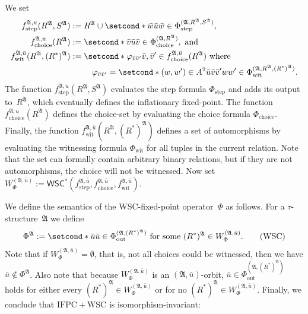 \documentclass[]{lmcs}
\renewcommand{\phi}{\varphi}
\newcommand{\formA}{\Phi}
\newcommand{\autoA}{\phi}
\newcommand{\tup}[1]{\bar{#1}}
\newcommand{\Struct}{\mathfrak{A}}
\newcommand{\vertA}{u}
\newcommand{\vertB}{v}
\newcommand{\vertC}{w}
\newcommand{\StructA}{\mathfrak{A}}
\newcommand{\StructVA}{A}
\newcommand{\sig}{\tau}
\newcommand{\IFPCWSC}{\ensuremath{\mathrm{IFPC{+}WSC}}}
\newcommand{\hiddenEqq}{\phantom{{}:={}}}
\newcommand{\formOut}{\formA_{\text{out}}}
\newcommand{\formStep}{\formA_{\text{step}}}
\newcommand{\formChoice}{\formA_{\text{choice}}}
\newcommand{\formWit}{\formA_{\text{wit}}}
\newcommand{\stepF}[0]{f_{\text{step}}}
\newcommand{\choiceF}[0]{f_{\text{choice}}}
\newcommand{\autF}[0]{f_{\text{wit}}}
\newcommand{\wscStarSym}{\mathsf{WSC}^*}
\newcommand{\wsc}[3]{\wscStarSym(#1,#2,#3)}
\begin{document}
We set
\begin{align*}
	\stepF^{\Struct, \tup{\vertA}}(R^\Struct,S^\Struct) &:= 
	R^\Struct\cup \setcond*{\tup{\vertC}}{
		\tup{\vertA}\tup{\vertC} \in \formStep^{(\StructA, R^\Struct, S^\Struct)}},
\\
	\choiceF^{\Struct, \tup{\vertA}}(R^\Struct) &:= 
	\setcond*{\tup{\vertB}}{\tup{\vertA}\tup{\vertB} \in \formChoice^{(\StructA,R^\Struct)}}, \text{ and}\\
	\autF^{\Struct, \tup{\vertA}}(R^\Struct,(R^*)^\Struct) &:=
	 \setcond*{ \autoA_{\tup{\vertB}\tup{\vertB}'}}{\tup{\vertB},\tup{\vertB}' \in \choiceF^{\Struct, \tup{\vertA}}(R^\Struct)} \text{ where}   \\
	 	&\hiddenEqq \quad\autoA_{\tup{\vertB}\tup{\vertB}'} = \setcond*{(\vertC,\vertC') \in \StructVA^2}{\tup{\vertA}\tup{\vertB}\tup{\vertB}'\vertC\vertC' \in \formWit^{(\StructA, R^\Struct, (R^*)^\Struct)}} .
\end{align*}
The function $\stepF^{\Struct, \tup{\vertA}}(R^\Struct,S^\Struct)$
evaluates the step formula $\formStep$ and adds its output to~$R^\Struct$,
which eventually defines the inflationary fixed-point.
The function $\choiceF^{\Struct, \tup{\vertA}}(R^\Struct)$
defines the choice-set by evaluating the choice formula $\formChoice$.
Finally,
the function $\autF^{\Struct, \tup{\vertA}}(R^\Struct,(R^*)^\Struct)$ defines a set of automorphisms
by evaluating the witnessing formula $\formWit$ for all tuples
in the current relation.
Note that the set can formally contain arbitrary binary relations,
but if they are not automorphisms, the choice will not be witnessed.
Now set $W_\formA^{(\StructA,\tup{\vertA})} := \wsc{\stepF^{\Struct, \tup{\vertA}}}{\choiceF^{\Struct, \tup{\vertA}}}{\autF^{\Struct, \tup{\vertA}}}$.

We define the semantics of the WSC-fixed-point operator~$\formA$ as follows.
For a $\sig$-structure~$\StructA$ we define
\begin{equation}
	\label{eqn:wsc-semantics}
	\formA^\Struct := \setcond*{\tup{\vertA}}{\tup{\vertA} \in \formOut^{(\Struct, (R^*)^\Struct)} \text{ for some } (R^*)^\Struct \in W_\formA^{(\StructA,\tup{\vertA})}}. \tag{WSC}
\end{equation}
Note that if $W_\formA^{(\StructA,\tup{\vertA})} =\emptyset$, that is, not all choices could be witnessed,
then we have $\tup{\vertA} \notin \formA^\Struct$.
Also note that because $W_\formA^{(\StructA,\tup{\vertA})}$ is an $(\StructA, \tup{\vertA})$-orbit,
$\tup{\vertA} \in \formOut^{(\StructA, (R^*)^\Struct)}$
holds for either every $(R^*)^\Struct \in W_\formA^{(\StructA,\tup{\vertA})}$ or for no $(R^*)^\Struct \in W_\formA^{(\StructA,\tup{\vertA})}$.
Finally, we conclude that \IFPCWSC{} is isomorphism-invariant:
\end{document}
